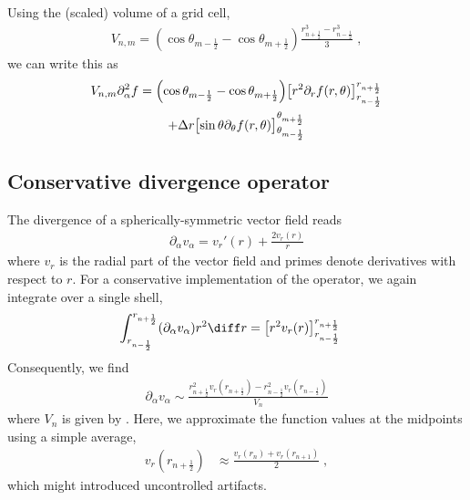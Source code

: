 \documentclass[
	superscriptaddress,
	twocolumn,
	aps, pre
]{revtex4-1}
\begin{document}
Using the (scaled) volume of a grid cell,
\begin{align}
	V_{n,m} =
		\left(\cos\theta_{m-\frac12} - \cos\theta_{m + \frac12}\right)
		\frac{r_{n + \frac12}^3 - r_{n - \frac12}^3}{3}
	\;,
\end{align}
we can write this as
\begin{multline}
	V_{n,m} \partial_\alpha^2 f
=\Bigl(\cos\theta_{m-\frac12} - \cos\theta_{m + \frac12}\Bigr)
			\bigl[r^2 \partial_r f(r, \theta)\bigr]_{r_{n - \frac12}}^{r_{n + \frac12}}
\\
	+  \Delta r
		\bigl[ \sin\theta \partial_\theta  f(r, \theta)\bigr]_{\theta_{m - \frac12}}^{\theta_{m + \frac12}}
\end{multline}


\subsection{Conservative divergence operator}
The divergence of a spherically-symmetric vector field reads
\begin{align}
	\partial_\alpha v_\alpha = v_r'(r)+\frac{2 v_r(r)}{r}
\end{align}
where $v_r$ is the radial part of the vector field and primes denote derivatives with respect to $r$.
For a conservative implementation of the operator, we again integrate over a single shell,
\begin{align}
	\int_{r_{n-\frac12}}^{r_{n + \frac12}} (\partial_\alpha v_{\alpha}) r^2 \diff r 
	 &= \left[r^2 v_r(r)\right]_{r_{n-\frac12}}^{r_{n + \frac12}}
\end{align}
Consequently, we find
\begin{align}
	\partial_\alpha v_{\alpha} \sim
	 \frac{r_{n + \frac12}^2 v_r(r_{n + \frac12}) - r_{n - \frac12}^2 v_r(r_{n - \frac12})}{V_n}
\end{align}
where $V_n$ is given by . 
Here, we approximate the function values at the midpoints using a simple average,
\begin{align}
	v_r(r_{n + \frac12}) &\approx \frac{v_r(r_{n}) + v_r(r_{n+1})}{2}
	\;,
\end{align}
which might introduced uncontrolled artifacts.
\end{document}
